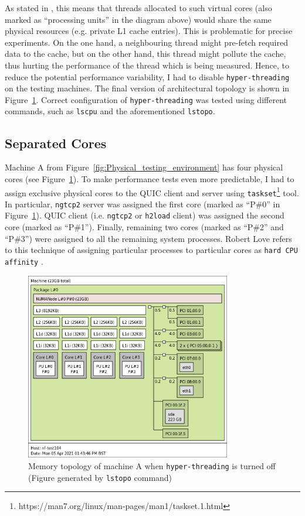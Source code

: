 \documentclass[12pt,a4paper,twoside,openright]{report}
\begin{document}
As stated in \cite{hyperthreading_book}, this means that threads allocated to such virtual cores (also marked as \enquote{processing units} in the diagram above) would share the same physical resources (e.g. private L1 cache entries).
This is problematic for precise experiments.
On the one hand, a neighbouring thread might pre-fetch required data to the cache, but on the other hand, this thread might pollute the cache, thus hurting the performance of the thread which is being measured.
Hence, to reduce the potential performance variability, I had to disable \texttt{hyper-threading} on the testing machines.
The final version of architectural topology is shown in Figure~\ref{fig:memory_topology}. 
Correct configuration of \texttt{hyper-threading} was tested using different commands, such as \texttt{lscpu} and the aforementioned \texttt{lstopo}. 

    
    
\subsection{Separated Cores} \label{SeparatedCores_Subsection_Tag}
Machine A from Figure~\ref{fig:Physical_testing_environment} has four physical cores (see Figure~\ref{fig:memory_topology}).
To make performance tests even more predictable, I had to assign exclusive physical cores to the QUIC client and server using \texttt{taskset}\footnote{https://man7.org/linux/man-pages/man1/taskset.1.html} tool.
In particular, \texttt{ngtcp2} server was assigned the first core (marked as \enquote{P\#0} in Figure~\ref{fig:memory_topology}).
QUIC client (i.e. \texttt{ngtcp2} or \texttt{h2load} client) was assigned the second core (marked as \enquote{P\#1}).
Finally, remaining two cores (marked as \enquote{P\#2} and \enquote{P\#3}) were assigned to all the remaining system processes.
Robert Love refers to this technique of assigning particular processes to particular cores as \texttt{hard CPU affinity} \cite{CPU_Affinity}.

    \begin{figure}[H]
    \centering
    \includegraphics[width=0.8\textwidth]{figs/memory_topology.png}
    \caption{Memory topology of machine A  when \texttt{hyper-threading} is turned off (Figure generated by \texttt{lstopo} command)}
    \label{fig:memory_topology}
    \end{figure}
\end{document}
